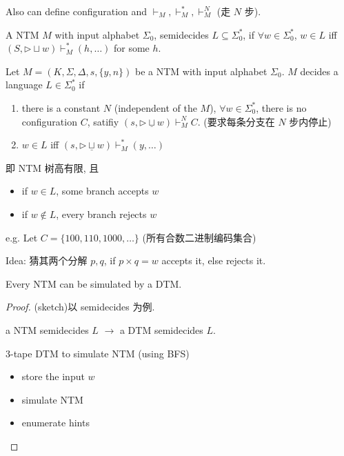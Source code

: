 Also can define configuration and $\vdash_M, \vdash_M^*, \vdash_M^N$ (走 $N$ 步). 

\begin{definition}
    A NTM $M$ with input alphabet $\Sigma_0$, semidecides $L\subseteq \Sigma_0^*$, if $\forall w \in \Sigma_0^*$, $w\in L$ iff $(S, \triangleright \sqcup w)\vdash^*_M (h,\dots)$ for some $h$. 
\end{definition}

\begin{definition}
    Let $M=(K, \Sigma, \Delta, s, \{ y,n \})$ be a NTM with input alphabet $\Sigma_0$. $M$ decides a language $L\in \Sigma_0^*$ if 
    \begin{enumerate}
        \item there is a constant $N$ (independent of the $M$), $\forall w\in \Sigma_0^*$, there is no configuration $C$, satifiy $(s,\triangleright \underline{\sqcup} w)\vdash_M^N C$. (要求每条分支在 $N$ 步内停止)
        \item $w\in L$ iff $(s,\triangleright \underline{\sqcup} w)\vdash_M^*(y,\dots)$
    \end{enumerate}
\end{definition}
即 NTM 树高有限, 且
\begin{itemize}
    \item if $w\in L$, some branch accepts $w$
    \item if $w\notin L$, every branch rejects $w$
\end{itemize}

e.g. Let $C=\{ 100, 110, 1000, \dots \}$ (所有合数二进制编码集合) 

Idea: 猜其两个分解 $p,q$, if $p\times q=w$ accepts it, else rejects it. 

\begin{theorem}
    Every NTM can be simulated by a DTM. 
\end{theorem}
\begin{proof}(sketch)以 semidecides 为例. 

    a NTM semidecides $L$ $\to$ a DTM semidecides $L$. 

    3-tape DTM to simulate NTM (using BFS) 
    \begin{itemize}
        \item store the input $w$
        \item simulate NTM
        \item enumerate hints
    \end{itemize}
\end{proof}